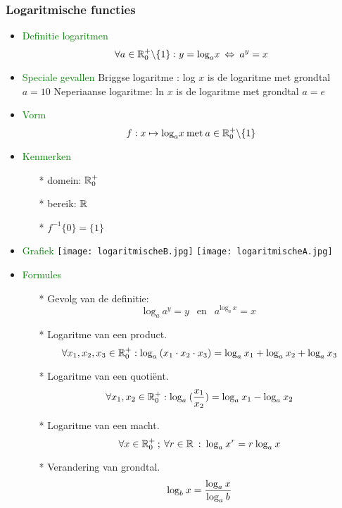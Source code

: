 \subsubsection{Logaritmische functies} \label{logaritmische functies}
		\begin{itemize}%
		\item  \textcolor{green}{Definitie logaritmen}\newline
		\[\forall a\in \mathbb{R}^+_0\backslash \{1\} : y = \mbox{log}_a x\: \Leftrightarrow\: a^y = 		x\]
		\item \textcolor{green}{Speciale gevallen}\newline
		Briggse logaritme : log $x$ is de logaritme met grondtal $a=10$\newline
		Neperiaanse logaritme: ln $x$ is de logaritme met grondtal $a=e$\newline
		\item \textcolor{green}{Vorm}
		\[f:x\mapsto \mbox{log}_a x \: \mbox{met}\: a\in \mathbb{R}^+_0\backslash \{1\}\]
		\item \textcolor{green}{Kenmerken}
			\begin{itemize}
			\item[*] domein: $\mathbb{R}^+_0$
			\item[*] bereik: $\mathbb{R}$
			\item[*] $f^{-1}\{0\} = \{1\}$
			\end{itemize}
		\item \textcolor{green}{Grafiek}\newline
                \texttt{[image: logaritmischeB.jpg]}
                \texttt{[image: logaritmischeA.jpg]}
		\item \textcolor{green}{\hypertarget{logaritmen}{Formules}}\label{logaritmen}\newline
			\begin{itemize}
			\item[*] Gevolg van de definitie:
			\[\mbox{log}_a \:a^y =y\:\: \mbox{ en }\:\: a^{\mbox{log}_a \:x}=x\]
			\item[*] Logaritme van een product.
			\[\forall x_1, x_2, x_3 \in \mathbb{R}^+_0 : \mbox{log}_a\:(x_1 \cdot x_2\cdot x_3) = 			\mbox{log}_a \:x_1 + \mbox{log}_a \:x_2 + \mbox{log}_a \:x_3 \]
			\item[*] Logaritme van een quoti\"ent.
			\[\forall x_1, x_2 \in \mathbb{R}^+_0 : \mbox{log}_a\:(\displaystyle\frac{\displaystyle x_1}{\displaystyle x_2}) = 			\mbox{log}_a \:x_1 - \mbox{log}_a \:x_2 \]
			\item[*] Logaritme van een macht.
			\[\forall x \in \mathbb{R}^+_0\:;\: \forall r \in \mathbb{R} \: : \:\mbox{log}_a \:x^r 			= r\:\mbox{log}_a \:x\]
			\item[*] Verandering van grondtal.
			\[\mbox{log}_b \:x =\displaystyle\frac{\displaystyle \mbox{log}_a\:x}{\displaystyle \mbox{log}_a \:b}\]
			\end{itemize}
		 
		\end{itemize}%


